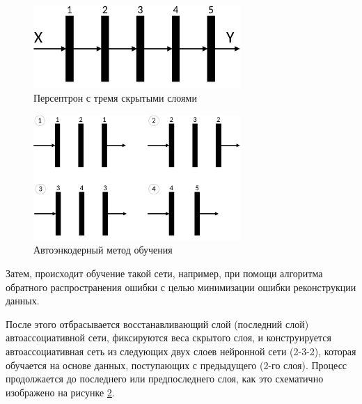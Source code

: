 \begin{figure}[H]
  \centering
  \includegraphics[width=0.7\textwidth]{man-source/images/ch1/pic1-5.pdf}
  \caption{Персептрон с тремя скрытыми слоями}
  \label{fig:pic1_5}
\end{figure}	

\begin{figure}[H]
  \centering
  \includegraphics[width=0.7\textwidth]{man-source/images/ch1/pic1-6.pdf}
  \caption{Автоэнкодерный метод обучения}
  \label{fig:pic1_6}
\end{figure}

Затем, происходит обучение такой сети, например, при помощи алгоритма обратного распространения ошибки с целью минимизации ошибки реконструкции данных. 
	
После этого отбрасывается восстанавливающий слой (последний слой) автоассоциативной сети, фиксируются веса скрытого слоя, и конструируется автоассоциативная сеть из следующих двух слоев нейронной сети (2-3-2), которая обучается на основе данных, поступающих с предыдущего (2-го слоя). Процесс продолжается до последнего или предпоследнего слоя, как это схематично изображено на рисунке \ref{fig:pic1_6}. %
	
